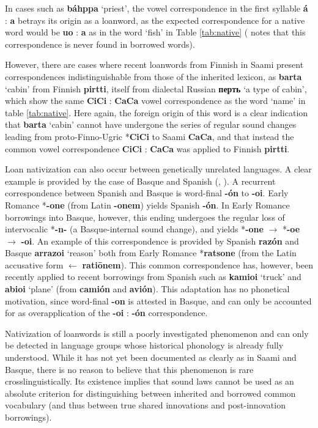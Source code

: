 \documentclass[svgnames,12pt]{scrartcl}
\newcommand{\ipa}[1]{\textbf{{\phon\mbox{#1}}}}
\begin{document}
{{In cases such as \ipa{báhppa} `priest', the vowel correspondence in the first syllable \ipa{á} : \ipa{a} betrays its origin as a loanword, as the expected correspondence for a native word would be \ipa{uo} : \ipa{a} as in the word `fish' in Table \ref{tab:native} (\citealt[35]{aikio06nativization} notes that this correspondence is never found in borrowed words).

However, there are cases where recent loanwords from Finnish in Saami present correspondences indistinguishable from those of the inherited lexicon, as \ipa{barta} `cabin' from Finnish \ipa{pirtti}, itself from dialectal Russian \ipa{перть} `a type of cabin', which show the same \ipa{CiCi} : \ipa{CaCa} vowel correspondence as the word `name' in table \ref{tab:native}. Here again, the foreign origin of this word is a clear indication that \ipa{barta} `cabin' cannot have undergone the series of regular sound changes leading from proto-Finno-Ugric *\ipa{CiCi} to Saami \ipa{CaCa}, and that instead the common vowel correspondence \ipa{CiCi} : \ipa{CaCa} was applied to Finnish \ipa{pirtti}.

 
Loan nativization can also occur between genetically unrelated languages. A clear example is provided by the case of Basque and Spanish (\citealt[53-54]{trask00chronology}, \citealt[21-3]{aikio06nativization}). 
A recurrent correspondence between Spanish and Basque is word-final \ipa{-ón} to \ipa{-oi}. Early Romance *\ipa{-one} (from Latin \ipa{-onem}) yields Spanish \ipa{-ón}. In Early Romance borrowings into Basque, however, this ending undergoes the regular loss of intervocalic *\ipa{-n-} (a Basque-internal sound change), and yields *\ipa{-one} $\rightarrow$ *\ipa{-oe} $\rightarrow$ \ipa{-oi}. An example of this correspondence is provided by Spanish \ipa{razón} and Basque \ipa{arrazoi} `reason' both from Early Romance *\ipa{ratsone} (from the Latin accusative form $\leftarrow$ \ipa{ratiōnem}).
This common correspondence has, however, been recently applied to recent borrowings from Spanish such as \ipa{kamioi} `truck' and \ipa{abioi} `plane' (from \ipa{camión} and \ipa{avión}). This adaptation has no phonetical motivation, since word-final \ipa{-on} is attested in Basque, and can only be accounted for as overapplication of the \ipa{-oi} : \ipa{-ón} correspondence.
 
Nativization of loanwords is still a poorly investigated phenomenon and can only be detected in
language groups whose historical phonology is already fully understood. While it has not yet been
documented as clearly as in Saami and Basque, there is no reason to believe that this phenomenon is
rare crosslinguistically. Its existence implies that sound laws cannot be used as an absolute
criterion for distinguishing between inherited and borrowed common vocabulary (and thus between true shared innovations and post-innovation borrowings).


}}
\end{document}
